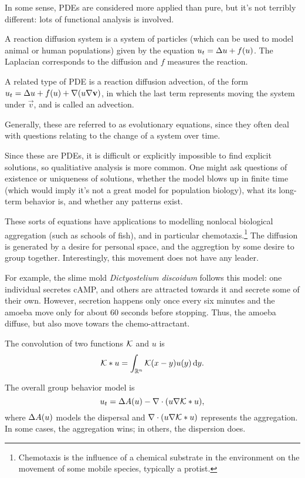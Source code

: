 In some sense, PDEs are considered more applied than pure, but it's not terribly different: lots of functional analysis is involved.

A reaction diffusion system is a system of particles (which can be used to model animal or human populations) given by the equation $u_t = \Delta u + f(u)$. The Laplacian corresponds to the diffusion and $f$ measures the reaction.

A related type of PDE is a reaction diffusion advection, of the form $u_t = \Delta u + f(u) +\nabla(u\nabla \mathbf v)$, in which the last term represents moving the system under $\vec v$, and is called an advection.

Generally, these are referred to as evolutionary equations, since they often deal with questions relating to the change of a system over time.

Since these are PDEs, it is difficult or explicitly impossible to find explicit solutions, so qualitiative analysis is more common. One might ask questions of existence or uniqueness of solutions, whether the model blows up in finite time (which would imply it's not a great model for population biology), what its long-term behavior is, and whether any patterns exist.

These sorts of equations have applications to modelling nonlocal biological aggregation (such as schools of fish), and in particular chemotaxis.\footnote{Chemotaxis is the influence of a chemical substrate in the environment on the movement of some mobile species, typically a protist.} The diffusion is generated by a desire for personal space, and the aggregtion by some desire to group together. Interestingly, this movement does not have any leader.

For example, the slime mold \emph{Dictyostelium discoidum} follows this model: one individual secretes cAMP, and others are attracted towards it and secrete some of their own. However, secretion happens only once every six minutes and the amoeba move only for about 60 seconds before stopping. Thus, the amoeba diffuse, but also move towars the chemo-attractant.

\begin{defn}
The convolution of two functions $\mathcal K$ and $u$ is
\[\mathcal K * u = \int_{\mathbb{R}^n} \mathcal K(x-y)u(y)\,\mathrm{d} y.\]
\end{defn}

The overall group behavior model is
\[u_t = \Delta A(u) - \nabla \cdot (u\nabla \mathcal K * u),\]
where $\Delta A(u)$ models the dispersal and $\nabla \cdot (u\nabla \mathcal K * u)$ represents the aggregation. In some cases, the aggregation wins; in others, the dispersion does.

